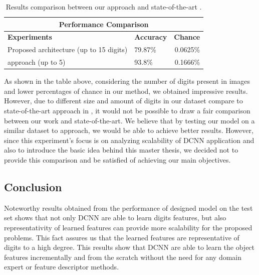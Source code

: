 
\begin{table}[H]
\centering
\small\sffamily
\begin{tabular}{llr}
\multicolumn{3}{c}{\textbf{\textbf{Performance Comparison}}} \\
\bottomrule
\textbf{Experiments}  &   \textbf{Accuracy} & \textbf{Chance} \\
\bottomrule
Proposed architecture (up to 15 digits)     & 79.87\% & 0.0625\% \\
\citet{segui2015learning} approach (up to 5)& 93.8\% & 0.1666\%  \\

\bottomrule
\end{tabular}
\caption{Results comparison between our approach and state-of-the-art \cite{segui2015learning}.}
\label{tab:comp}
\end{table} 

As shown in the table above, considering the number of digits present in images and lower percentages of chance in our method, we obtained impressive results. However, due to different size and amount of digits in our dataset compare to state-of-the-art approach in \cite{segui2015learning}, it would not be possible to draw a fair comparison between our work and state-of-the-art. We believe that by testing our model on a similar dataset to \citet{segui2015learning} approach, we would be able to achieve better results. However, since this experiment's focus is on analyzing scalability of DCNN application and also to introduce the basic idea behind this master thesis, we decided not to provide this comparison and be satisfied of achieving our main objectives.  

\subsection{Conclusion}

Noteworthy results obtained from the performance of designed model on the test set shows that not only DCNN are able to learn digits features, but also representativity of learned features can provide more scalability for the proposed problems. This fact assures us that the learned features are representative of digits to a high degree. This results show that DCNN are able to learn the object features incrementally and from the scratch without the need for any domain expert or feature descriptor methods. 

